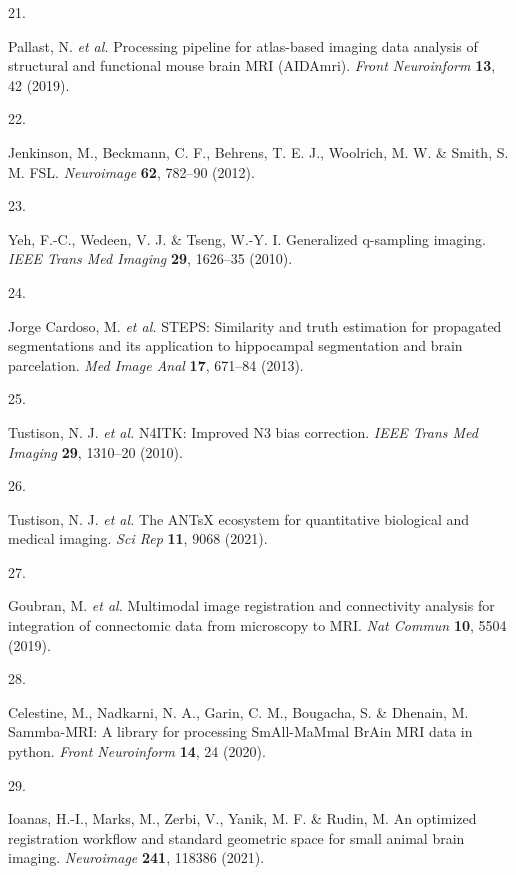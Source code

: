 \documentclass[
  12pt,
]{article}
\newlength{\cslhangindent}
\newlength{\csllabelwidth}
\newenvironment{CSLReferences}[2] %
 {%
  \setlength{\parindent}{0pt}
  \ifodd #1 \everypar{\setlength{\hangindent}{\cslhangindent}}\ignorespaces\fi
  \ifnum #2 > 0
  \setlength{\parskip}{#2\baselineskip}
  \fi
 }%
 {}
\newcommand{\CSLLeftMargin}[1]{\parbox[t]{\csllabelwidth}{#1}}
\newcommand{\CSLRightInline}[1]{\parbox[t]{\linewidth - \csllabelwidth}{#1}\break}
\begin{document}
\begin{CSLReferences}{0}{0}
\leavevmode{}%
\CSLLeftMargin{21. }
\CSLRightInline{Pallast, N. \emph{et al.} Processing pipeline for
atlas-based imaging data analysis of structural and functional mouse
brain MRI (AIDAmri). \emph{Front Neuroinform} \textbf{13}, 42 (2019).}

\leavevmode{}%
\CSLLeftMargin{22. }
\CSLRightInline{Jenkinson, M., Beckmann, C. F., Behrens, T. E. J.,
Woolrich, M. W. \& Smith, S. M. FSL. \emph{Neuroimage} \textbf{62},
782--90 (2012).}

\leavevmode{}%
\CSLLeftMargin{23. }
\CSLRightInline{Yeh, F.-C., Wedeen, V. J. \& Tseng, W.-Y. I. Generalized
q-sampling imaging. \emph{IEEE Trans Med Imaging} \textbf{29}, 1626--35
(2010).}

\leavevmode{}%
\CSLLeftMargin{24. }
\CSLRightInline{Jorge Cardoso, M. \emph{et al.} STEPS: Similarity and
truth estimation for propagated segmentations and its application to
hippocampal segmentation and brain parcelation. \emph{Med Image Anal}
\textbf{17}, 671--84 (2013).}

\leavevmode{}%
\CSLLeftMargin{25. }
\CSLRightInline{Tustison, N. J. \emph{et al.} {N4ITK}: Improved {N3}
bias correction. \emph{IEEE Trans Med Imaging} \textbf{29}, 1310--20
(2010).}

\leavevmode{}%
\CSLLeftMargin{26. }
\CSLRightInline{Tustison, N. J. \emph{et al.} The ANTsX ecosystem for
quantitative biological and medical imaging. \emph{Sci Rep} \textbf{11},
9068 (2021).}

\leavevmode{}%
\CSLLeftMargin{27. }
\CSLRightInline{Goubran, M. \emph{et al.} Multimodal image registration
and connectivity analysis for integration of connectomic data from
microscopy to MRI. \emph{Nat Commun} \textbf{10}, 5504 (2019).}

\leavevmode{}%
\CSLLeftMargin{28. }
\CSLRightInline{Celestine, M., Nadkarni, N. A., Garin, C. M., Bougacha,
S. \& Dhenain, M. Sammba-MRI: A library for processing SmAll-MaMmal
BrAin MRI data in python. \emph{Front Neuroinform} \textbf{14}, 24
(2020).}

\leavevmode{}%
\CSLLeftMargin{29. }
\CSLRightInline{Ioanas, H.-I., Marks, M., Zerbi, V., Yanik, M. F. \&
Rudin, M. An optimized registration workflow and standard geometric
space for small animal brain imaging. \emph{Neuroimage} \textbf{241},
118386 (2021).}


\end{CSLReferences}
\end{document}
